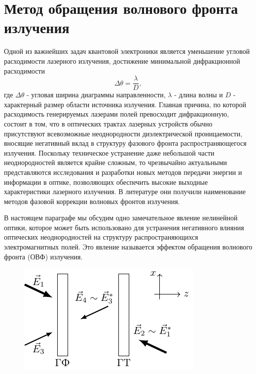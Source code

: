 \section{Метод обращения волнового фронта излучения}

Одной из важнейших задач квантовой электроники является уменьшение угловой расходимости лазерного излучения, достижение минимальной дифракционной расходимости
\begin{equation}
	\Delta \theta = \frac{\lambda}{D},
\end{equation}
где $\Delta \theta$ - угловая ширина диаграммы направленности, $\lambda$ - длина волны и $D$ - характерный размер области источника излучения. Главная причина, по которой расходимость генерируемых лазерами полей превосходит дифракционную, состоит в том, что в оптических трактах лазерных устройств обычно присутствуют всевозможные неоднородности диэлектрической проницаемости, вносящие негативный вклад в структуру фазового фронта распространяющегося излучения. Поскольку техническое устранение даже небольшой части неоднородностей является крайне сложным, то чрезвычайно актуальными представляются исследования и разработки новых методов передачи энергии и информации в оптике, позволяющих обеспечить высокие выходные характеристики лазерного излучения. В литературе они получили наименование методов фазовой коррекции волновых фронтов излучения.

В настоящем параграфе мы обсудим одно замечательное явление нелинейной оптики, которое может быть использовано для устранения негативного влияния оптических неоднородностей на структуру распространяющихся электромагнитных полей. Это явление называется эффектом обращения волнового фронта (ОВФ) излучения.

\begin{figure}[ht]
	\centering
	\includegraphics[scale=1.5]{fig/fig2.pdf}
	\caption{}
	\label{fig:figure2}
\end{figure}

